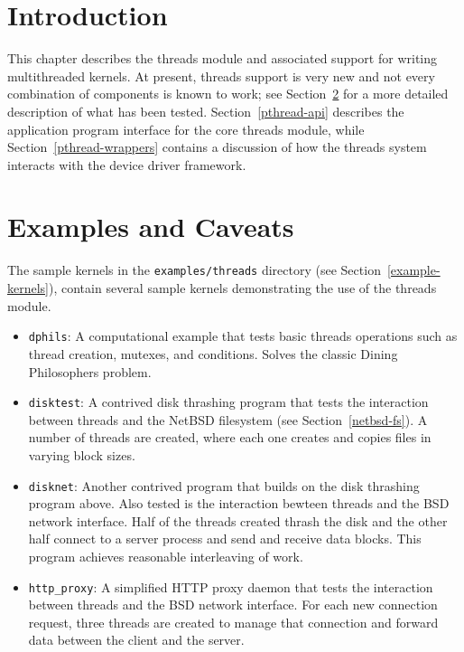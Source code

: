 %
% 
%
\label{pthread}

\section{Introduction}

This chapter describes the \posix{} threads module and associated support for
writing multithreaded kernels. At present, threads support is very new and
not every combination of components is known to work; see
Section~\ref{pthread-caveats} for a more detailed description of what has been
tested. Section~\ref{pthread-api} describes the application program
interface for the core \posix{} threads module, while
Section~\ref{pthread-wrappers} contains a discussion of how the threads system
interacts with the device driver framework.

\section{Examples and Caveats}
\label{pthread-caveats}

The sample kernels in the {\tt examples/threads} directory (see
Section~\ref{example-kernels}), contain several sample kernels demonstrating
the use of the \posix{} threads module. 

\begin{itemize}
\item	{\tt dphils}:
	A computational example that tests basic \posix{} threads
	operations such as thread creation, mutexes, and conditions.
	Solves the classic Dining Philosophers problem.
\item	{\tt disktest}:
	A contrived disk thrashing program that tests the interaction
	between \posix{} threads and the NetBSD filesystem (see
	Section~\ref{netbsd-fs}). A number of threads are created, where each
	one creates and copies files in varying block sizes.
\item	{\tt disknet}:
	Another contrived program that builds on the disk thrashing program
	above. Also tested is the interaction bewteen \posix{} threads and
	the BSD network interface. Half of the threads created thrash the
	disk and the other half connect to a server process and send and
	receive data blocks. This program achieves reasonable interleaving
	of work.
\item	{\tt http_proxy}:
	A simplified HTTP proxy daemon that tests the interaction between
	\posix{} threads and the BSD network interface. For each new
	connection request, three threads are created to manage that
	connection and forward data between the client and the server. 
\end{itemize}

